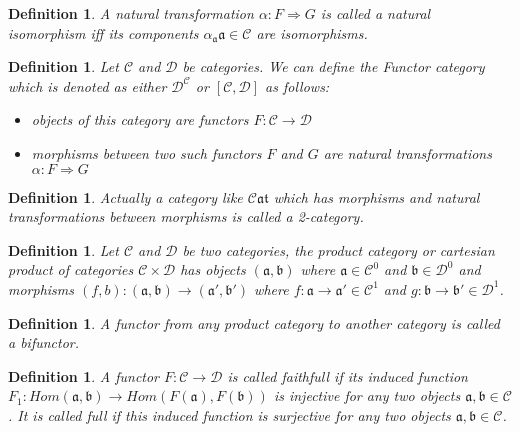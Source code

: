 \documentclass{article}
\newcommand{\cat}[1]{\mathcal{#1}} %
\newcommand{\cato}[1]{\cat{#1}^0} %
\newcommand{\catm}[1]{\cat{#1}^1} %
\newcommand{\ob}[1]{\mathfrak{#1}} %
\newcommand{\scat}{\cat{C}\ob{at}}
\newtheorem{definition}[theorem]{Definition}
\begin{document}
\begin{definition}
	A natural transformation $\alpha: F \Rightarrow G$ is called a \emph{natural isomorphism} iff its components $\alpha_{\ob{a}} \ob{a} \in \cat{C}$ are isomorphisms.
\end{definition}

\begin{definition}
	Let $\cat{C}$ and $\cat{D}$ be categories. We can define the \emph{Functor category} which is denoted as either $\cat{D}^{\cat{C}}$ or $[\cat{C}, \cat{D}]$ as follows:
	\begin{itemize}
		\item objects of this category are functors $F: \cat{C} \rightarrow \cat{D}$
		\item morphisms between two such functors $F$ and $G$ are natural transformations $\alpha: F \Rightarrow G$
	\end{itemize}
\end{definition}

\begin{definition}
	Actually a category like $\scat$ which has morphisms and natural transformations between morphisms is called a \emph{2-category}.
\end{definition}

\begin{definition}
	Let $\cat{C}$ and $\cat{D}$ be two categories, the \emph{product category} or \emph{cartesian product of categories} $\cat{C} \times \cat{D}$ has objects $(\ob{a}, \ob{b})$ where $\ob{a} \in \cato{C}$ and $\ob{b} \in \cato{D}$ and morphisms $(f,b): (\ob{a}, \ob{b}) \rightarrow (\ob{a'}, \ob{b'})$ where $f: \ob{a} \rightarrow \ob{a'} \in \catm{C}$ and $g: \ob{b} \rightarrow \ob{b'} \in \catm{D}$.
\end{definition}

\begin{definition}
	A functor from any product category to another category is called a \emph{bifunctor}.
\end{definition}

\begin{definition}
	A functor $F: \cat{C} \rightarrow \cat{D}$ is called \emph{faithfull} if its induced function $F_1: Hom(\ob{a}, \ob{b}) \rightarrow Hom(F(\ob{a}), F(\ob{b}))$ is injective for any two objects $\ob{a}, \ob{b} \in \cat{C}$. It is called \emph{full} if this induced function is surjective for any two objects $\ob{a}, \ob{b} \in \cat{C}$.
\end{definition}
\end{document}
